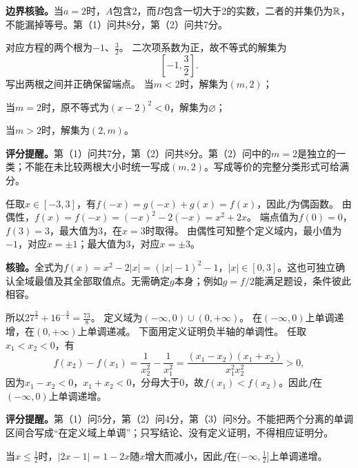 \textbf{边界核验。}当$a=2$时，$A$包含2，而$B$包含一切大于2的实数，二者的并集仍为$\mathbb R$，不能漏掉等号。第（1）问共8分，第（2）问共7分。

对应方程的两个根为$-1$、$\frac32$。
二次项系数为正，故不等式的解集为
\[
\boxed{\left[-1,\frac32\right]}.
\]
写出两根之间并正确保留端点。
当$m<2$时，解集为$(m,2)$；

当$m=2$时，原不等式为$(x-2)^2<0$，解集为$\varnothing$；

当$m>2$时，解集为$(2,m)$。

\textbf{评分提醒。}第（1）问共7分，第（2）问共8分。第（2）问中的$m=2$是独立的一类；不能在未比较两根大小时统一写成$(m,2)$。写成等价的完整分类形式可给满分。

\newpage
{}
任取$x\in[-3,3]$，有$f(-x)=g(-x)+g(x)=f(x)$，因此$f$为偶函数。
由偶性，$f(x)=f(-x)=(-x)^2-2(-x)=x^2+2x$。
端点值为$f(0)=0$，$f(3)=3$，最大值为3，在$x=3$时取得。
由偶性可知整个定义域内，最小值为$-1$，对应$x=\pm1$；最大值为3，对应$x=\pm3$。

\textbf{核验。}全式为$f(x)=x^2-2|x|=(|x|-1)^2-1$，$|x|\in[0,3]$。这也可独立确认全域最值及其全部取值点。无需确定$g$本身；例如$g=f/2$能满足题设，条件彼此相容。

所以$27^{\frac23}+16^{-\frac34}=\frac{73}{8}$。
定义域为$(-\infty,0)\cup(0,+\infty)$。
在$(-\infty,0)$上单调递增，在$(0,+\infty)$上单调递减。
下面用定义证明负半轴的单调性。
任取$x_1<x_2<0$，有
\[
f(x_2)-f(x_1)=\frac1{x_2^2}-\frac1{x_1^2}
=\frac{(x_1-x_2)(x_1+x_2)}{x_1^2x_2^2}>0,
\]
因为$x_1-x_2<0$，$x_1+x_2<0$，分母大于0，故$f(x_1)<f(x_2)$。因此$f$在$(-\infty,0)$上单调递增。

\textbf{评分提醒。}第（1）问5分，第（2）问4分，第（3）问8分。不能把两个分离的单调区间合写成“在定义域上单调”；只写结论、没有定义证明，不得相应证明分。

\newpage
{}
当$x\le\frac12$时，$|2x-1|=1-2x$随$x$增大而减小，因此$f$在$(-\infty,\frac12]$上单调递增。

